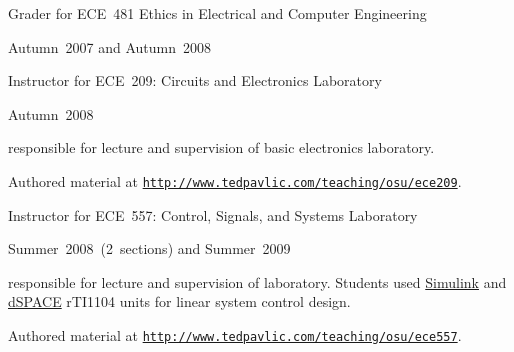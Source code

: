 \documentclass{article}
\newcommand{\halfblankline}{\quad\vspace{-0.5\baselineskip}\pagebreak[3]}
\providecommand*\url[1]{\href{#1}{#1}}
\renewcommand*\url[1]{\href{#1}{\texttt{#1}}}
\begin{document}
\begin{outerlist}
\begin{innerlist}
        \halfblankline

        \item Grader for ECE~481 Ethics in Electrical and Computer Engineering
        \begin{innerlist}
            \item Autumn~2007 and Autumn~2008
        \end{innerlist}

        \halfblankline

        \item Instructor for ECE~209: Circuits and Electronics
            Laboratory
        \begin{innerlist}
            \item Autumn~2008


            \item responsible for lecture and supervision of basic
                electronics laboratory.

            \item Authored material at
                \url{http://www.tedpavlic.com/teaching/osu/ece209}.
        \end{innerlist}

        \halfblankline

        \item Instructor for ECE~557: Control, Signals, and Systems
            Laboratory
        \begin{innerlist}
            \item Summer~2008~(2~sections) and Summer~2009


            \item responsible for lecture and supervision of laboratory.
                Students used
                \href{http://www.mathworks.com/products/simulink/}{Simulink}
                and \href{http://www.dspaceinc.com/}{dSPACE} rTI1104
                units for linear system control design.

            \item Authored material at
                \url{http://www.tedpavlic.com/teaching/osu/ece557}.
        \end{innerlist}

        \halfblankline


\end{innerlist}
\end{outerlist}
\end{document}
